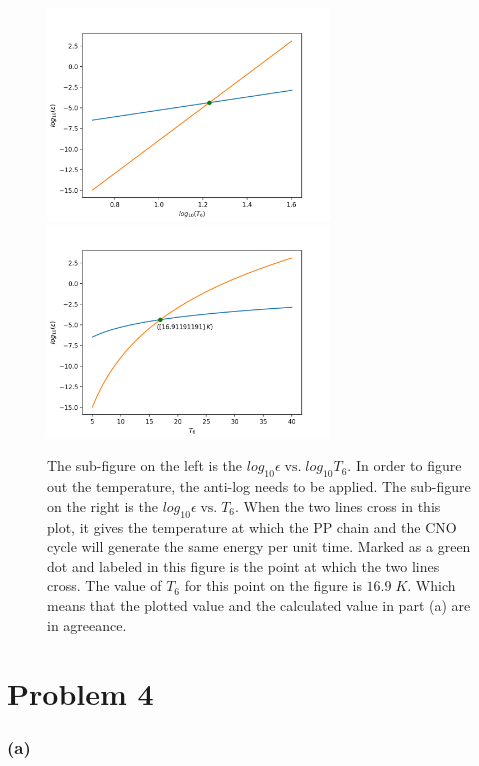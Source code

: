 \documentclass[11pt]{article}
\begin{document}
\begin{figure}[h!]
    \centering
    {{\includegraphics[width=7.5cm]{problem_3_fig_1.png} }}%
    \qquad
    {{\includegraphics[width=7.5cm]{problem_3_fig_2.png} }}%
    \caption{The sub-figure on the left is the $log_{10} \epsilon \; \text{vs.} \; log_{10} T_{6}$. In order to figure out the temperature, the anti-log needs to be applied. The sub-figure on the right is the $log_{10} \epsilon \; \text{vs.} \; T_{6}$. When the two lines cross in this plot, it gives the temperature at which the PP chain and the CNO cycle will generate the same energy per unit time. Marked as a green dot and labeled in this figure is the point at which the two lines cross. The value of $T_{6}$ for this point on the figure is $16.9 \; K$. Which means that the plotted value and the calculated value in part (a) are in agreeance. }
    \label{fig:example}%
\end{figure}



\clearpage

\section*{Problem 4}

\subsubsection*{(a)}
\end{document}

